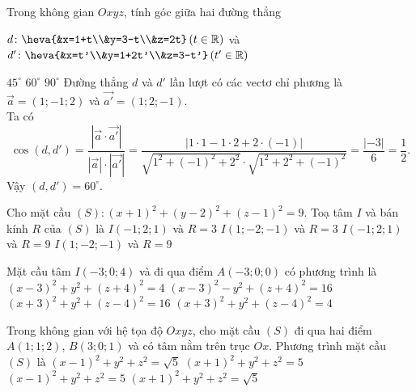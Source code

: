 \begin{ex}%
	Trong không gian $Oxyz$, tính góc giữa hai đường thẳng
	\begin{center}
		$d\colon \heva{&x=1+t\\&y=3-t\\&z=2t} \left(t \in \mathbb{R}\right)$ và $d'\colon \heva{&x=t'\\&y=1+2t'\\&z=3-t'} \left(t' \in \mathbb{R}\right)$
	\end{center}
	{$45^{\circ}$}
	{\True $60^{\circ}$}
	{$90^{\circ}$}
	\loigiai
	{
		Đường thẳng $d$ và $d'$ lần lượt có các vectơ chỉ phương là $\overrightarrow{a}=\left(1;-1;2\right)$ và $\overrightarrow{a'}=\left(1;2;-1\right)$.\\
		Ta có
		$$\cos\left(d,d'\right)=\dfrac{|\overrightarrow{a}\cdot \overrightarrow{a'}|}{|\overrightarrow{a}|\cdot |\overrightarrow{a'}|}=\dfrac{|1\cdot 1-1\cdot 2+2\cdot (-1)|}{\sqrt{1^2+(-1)^2+2^2}\cdot \sqrt{1^2+2^2+(-1)^2}}=\dfrac{|-3|}{6}=\dfrac{1}{2}.$$
		Vậy $\left(d,d'\right)=60^{\circ}$.
	}
\end{ex}
\begin{ex}%
	Cho mặt cầu $(S)\colon (x+1)^2+(y-2)^2+(z-1)^2=9$. 
	Toạ tâm $I$ và bán kính $R$ của $(S)$ là
	\choice
	{\True $I(-1 ; 2 ; 1)$ và $R=3$}
	{$I(1 ;-2 ;-1)$ và $R=3$}
	{$I(-1 ; 2 ; 1)$ và $R=9$}
	{$I(1 ;-2 ;-1)$ và $R=9$}
\end{ex}
\begin{ex}%
	Mặt cầu tâm $I(-3 ; 0 ; 4)$ và đi qua điểm $A(-3 ; 0 ; 0)$ có phương trình là
	\choice
	{$(x-3)^2+y^2+(z+4)^2=4$}
	{$(x-3)^2-y^2+(z+4)^2=16$}
	{\True $(x+3)^2+y^2+(z-4)^2=16$}
	{$(x+3)^2+y^2+(z-4)^2=4$}
\end{ex}
\begin{ex}%
	Trong không gian với hệ tọa độ $Oxyz$, cho mặt cầu $(S)$ đi qua hai điểm $A(1;1;2)$, $B(3;0;1)$ và có tâm nằm trên trục $Ox$. Phương trình mặt cầu $(S)$ là
	\choice
	{${(x-1)}^2+y^2+z^2=\sqrt{5}$}
	{${(x+1)}^2+y^2+z^2=5$}
	{\True ${(x-1)}^2+y^2+z^2=5$}
	{${(x+1)}^2+y^2+z^2=\sqrt{5}$}
\end{ex}
